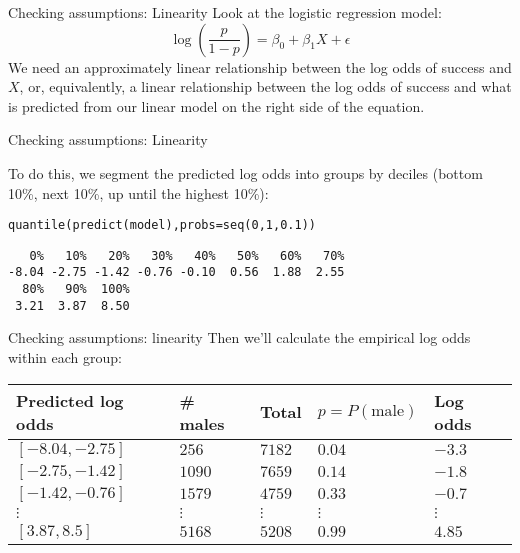 \documentclass{beamer}\usepackage[]{graphicx}\usepackage[]{color}
\makeatletter
\newcommand{\hlnum}[1]{\textcolor[rgb]{0.824,0.412,0.118}{#1}}%
\newcommand{\hlstd}[1]{\textcolor[rgb]{1,0.894,0.769}{#1}}%
\newcommand{\hlkwc}[1]{\textcolor[rgb]{0.78,0.941,0.545}{#1}}%
\newcommand{\hlkwd}[1]{\textcolor[rgb]{1,0.78,0.769}{#1}}%
\newenvironment{kframe}{%
 \def\at@end@of@kframe{}%
 \ifinner\ifhmode%
  \def\at@end@of@kframe{\end{minipage}}%
  \begin{minipage}{\columnwidth}%
 \fi\fi%
 \def\FrameCommand##1{\hskip\@totalleftmargin \hskip-\fboxsep
 \colorbox{shadecolor}{##1}\hskip-\fboxsep
     \hskip-\linewidth \hskip-\@totalleftmargin \hskip\columnwidth}%
 \MakeFramed {\advance\hsize-\width
   \@totalleftmargin\z@ \linewidth\hsize
   \@setminipage}}%
 {\par\unskip\endMakeFramed%
 \at@end@of@kframe}
\newenvironment{knitrout}{}{} %
\makeatother
\begin{document}
\begin{darkframes}
    \begin{frame}{Checking assumptions: Linearity}
      Look at the logistic regression model:
      \[
        \log\left(\frac{p}{1-p}\right) = \beta_0 + \beta_1 X + \epsilon
      \]
      We need an approximately linear relationship between the \alert{log odds of success} and $X$, or, equivalently, a linear relationship between the log odds of success and what is predicted from our linear model on the right side of the equation.
    \end{frame}

    \begin{frame}[fragile]{Checking assumptions: Linearity}
      

      To do this, we segment the predicted log odds into groups by deciles (bottom 10\%, next 10\%, up until the highest 10\%):

\begin{knitrout}
\begin{kframe}
\begin{alltt}
\hlkwd{quantile}\hlstd{(}\hlkwd{predict}\hlstd{(model),} \hlkwc{probs}\hlstd{=}\hlkwd{seq}\hlstd{(}\hlnum{0}\hlstd{,} \hlnum{1}\hlstd{,} \hlnum{0.1}\hlstd{))}
\end{alltt}
\begin{verbatim}
   0%   10%   20%   30%   40%   50%   60%   70% 
-8.04 -2.75 -1.42 -0.76 -0.10  0.56  1.88  2.55 
  80%   90%  100% 
 3.21  3.87  8.50 
\end{verbatim}
\end{kframe}
\end{knitrout}
    \end{frame}

    \begin{frame}{Checking assumptions: linearity}
      Then we'll calculate the empirical log odds within each group:

      \begin{center}
        \begin{tabular}{lllll}
          Predicted log odds & \# males & Total & $p=P(\text{male})$ & Log odds \\
          \hline
          $[ -8.04, -2.75 ]$ & $256$ &  $7182$ & $0.04$ & $-3.3$ \\
          $[ -2.75, -1.42 ]$ & $1090$ &  $7659$ & $0.14$ & $-1.8$ \\
          $[ -1.42, -0.76 ]$ & $1579$ &  $4759$ & $0.33$ & $-0.7$ \\
          $\vdots$ & $\vdots$ & $\vdots$ & $\vdots$ & $\vdots$ \\
          $[ 3.87, 8.5 ]$ & $5168$ &  $5208$ & $0.99$ & $4.85$ \\


\end{tabular}
\end{center}
\end{frame}
\end{darkframes}
\end{document}

